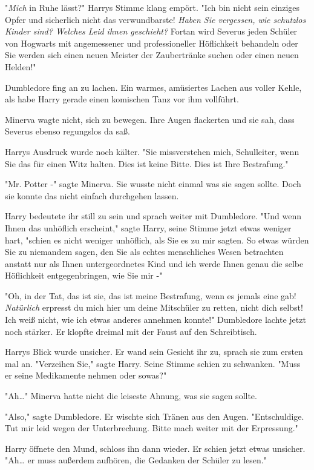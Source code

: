 {"\emph{Mich} in Ruhe lässt?" Harrys Stimme klang empört. "Ich bin nicht sein einziges Opfer und sicherlich nicht das verwundbarste! \emph{Haben Sie vergessen, wie schutzlos Kinder sind? Welches Leid ihnen geschieht?} Fortan wird Severus jeden Schüler von Hogwarts mit angemessener und professioneller Höflichkeit behandeln oder Sie werden sich einen neuen Meister der Zaubertränke suchen oder einen neuen Helden!"

Dumbledore fing an zu lachen. Ein warmes, amüsiertes Lachen aus voller Kehle, als habe Harry gerade einen komischen Tanz vor ihm vollführt.

Minerva wagte nicht, sich zu bewegen. Ihre Augen flackerten und sie sah, dass Severus ebenso regungslos da saß.

Harrys Ausdruck wurde noch kälter. "Sie missverstehen mich, Schulleiter, wenn Sie das für einen Witz halten. Dies ist keine Bitte. Dies ist Ihre Bestrafung."

"Mr. Potter -" sagte Minerva. Sie wusste nicht einmal was sie sagen sollte. Doch sie konnte das nicht einfach durchgehen lassen.

Harry bedeutete ihr still zu sein und sprach weiter mit Dumbledore. "Und wenn Ihnen das unhöflich erscheint," sagte Harry, seine Stimme jetzt etwas weniger hart, "schien es nicht weniger unhöflich, als Sie es zu mir sagten. So etwas würden Sie zu niemandem sagen, den Sie als echtes menschliches Wesen betrachten anstatt nur als Ihnen untergeordnetes Kind und ich werde Ihnen genau die selbe Höflichkeit entgegenbringen, wie Sie mir -"

"Oh, in der Tat, das ist sie, das ist meine Bestrafung, wenn es jemals eine gab! \emph{Natürlich} erpresst du mich hier um deine Mitschüler zu retten, nicht dich selbst! Ich weiß nicht, wie ich etwas anderes annehmen konnte!" Dumbledore lachte jetzt noch stärker. Er klopfte dreimal mit der Faust auf den Schreibtisch.

Harrys Blick wurde unsicher. Er wand sein Gesicht ihr zu, sprach sie zum ersten mal an. "Verzeihen Sie," sagte Harry. Seine Stimme schien zu schwanken. "Muss er seine Medikamente nehmen oder sowas?"

"Ah…" Minerva hatte nicht die leiseste Ahnung, was sie sagen sollte.

"Also," sagte Dumbledore. Er wischte sich Tränen aus den Augen. "Entschuldige. Tut mir leid wegen der Unterbrechung. Bitte mach weiter mit der Erpressung."

Harry öffnete den Mund, schloss ihn dann wieder. Er schien jetzt etwas unsicher. "Ah… er muss außerdem aufhören, die Gedanken der Schüler zu lesen."

}
